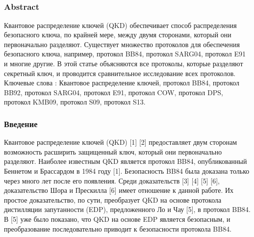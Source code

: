 \subsection{\trnas}
\subsubsection*{Abstract}

Квантовое распределение ключей (QKD) обеспечивает способ распределения безопасного ключа, по крайней мере, между двумя сторонами, который они первоначально разделяют. Существует множество протоколов для обеспечения безопасного ключа, например, протокол BB84, протокол SARG04, протокол E91 и многие другие. В этой статье объясняются все протоколы, которые разделяют секретный ключ, и проводится сравнительное исследование всех протоколов.
Ключевые слова : Квантовое распределение ключей, протокол BB84, протокол BB92, протокол SARG04, протокол E91, протокол COW, протокол DPS, протокол KMB09, протокол S09, протокол S13.

\subsubsection{Введение}

Квантовое распределение ключей (QKD) [1] [2] предоставляет двум сторонам возможность расширить защищенный ключ, который они первоначально разделяют. Наиболее известным QKD является протокол BB84, опубликованный Беннетом и Брассардом в 1984 году [1]. Безопасность BB84 была доказана только через много лет после его появления. Среди доказательств [3] [4] [5] [6], доказательство Шора и Прескилла [6] имеет отношение к данной работе. Их простое доказательство, по сути, преобразует QKD на основе протокола дистилляции запутанности (EDP), предложенного Ло и Чау [5], в протокол BB84. В [5] уже было показано, что QKD на основе EDP является безопасным, и преобразование последовательно приводит к безопасности протокола BB84.


